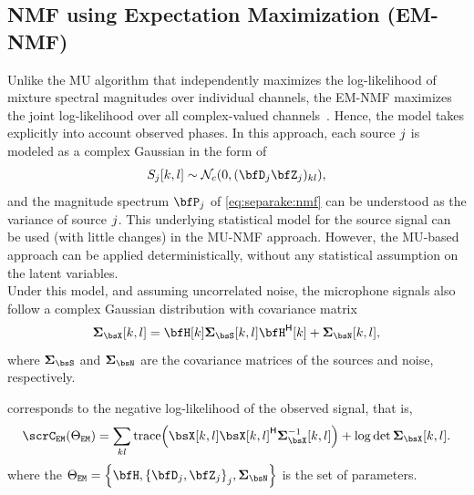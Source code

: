 \subsection{NMF using Expectation Maximization (EM-NMF)}\label{sec:separake:em}
Unlike the \ac{MU} algorithm that independently maximizes the log-likelihood of mixture spectral magnitudes over individual channels, the \ac{EM}-\ac{NMF} maximizes the joint log-likelihood over all complex-valued channels~.
Hence, the model takes explicitly into account observed phases.
In this approach, each source $j$ is modeled as a complex Gaussian in the form of
\begin{equation}
    \SRC_\idxSrc[k,l] \sim \mathcal{N}_c \kparen{0, (\mD_\idxSrc\mZ_\idxSrc)_{kl}},
\end{equation}
and the magnitude spectrum $\mP_\idxSrc$ of \eqref{eq:separake:nmf} can be understood as the variance of source $j$.
This underlying statistical model for the source signal can be used (with little changes) in the \ac{MU}-\ac{NMF} approach.
However, the \ac{MU}-based approach can be applied deterministically, without any statistical assumption on the latent variables.
\\Under this model, and assuming uncorrelated noise, the microphone signals also follow a complex Gaussian distribution with covariance matrix
\begin{equation}
    \mSigma_{\MICS}[k,l] = \FLTSS[k] \mSigma_{\SRCS} [k,l] \khermitian{\FLTSS}[k] + \mSigma_{\NSES}[k,l]
    ,
\end{equation}
where $\mSigma_{\SRCS}$ and $\mSigma_{\NSES}$ are the covariance matrices of the sources and noise, respectively.

 corresponds to the negative log-likelihood of the observed signal, that is,
\begin{equation}\label{eq:separake:loglike}
    \scrC_{\mathtt{EM}}(\Theta_{\mathtt{EM}}) = \sum\limits_{kl} \trace\kparen{\MICS[k,l] \khermitian{\MICS[k,l]} \mSigma_{\MICS}^{-1}[k,l]} \\
    + \log\det\mSigma_{\MICS}[k,l].
\end{equation}
where the $\Theta_{\mathtt{EM}} = \set{\FLTSS, \set{\mD_\idxSrc, \mZ_\idxSrc}_\idxSrc, \mSigma_{\NSES}}$ is the set of parameters.

